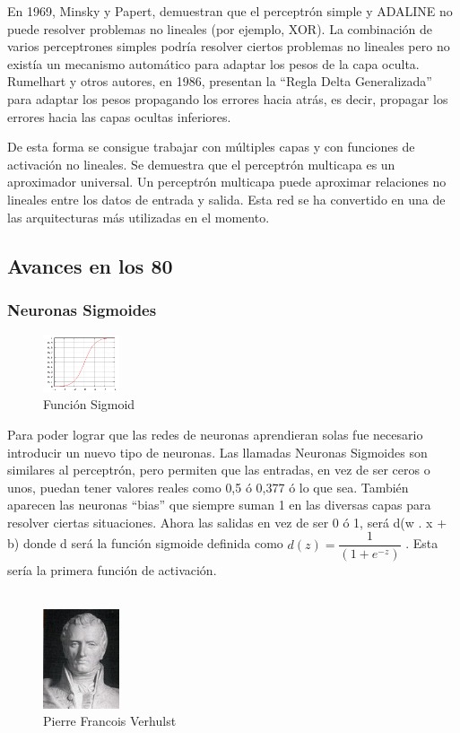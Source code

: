 \documentclass[a4paper]{article}
\begin{document}
En 1969, Minsky y Papert, demuestran que el perceptrón simple y 
ADALINE no puede resolver problemas no lineales (por ejemplo, 
XOR). La combinación de varios perceptrones simples podría 
resolver ciertos problemas no lineales pero no existía un 
mecanismo automático para adaptar los pesos de la capa oculta. 
Rumelhart y otros autores, en 1986, presentan la ``Regla Delta 
Generalizada'' para adaptar los pesos propagando los errores hacia 
atrás, es decir, propagar los errores hacia las capas ocultas 
inferiores.


De esta forma se consigue trabajar con múltiples capas y con 
funciones de activación no lineales. Se demuestra que el 
perceptrón multicapa es un aproximador universal. Un perceptrón 
multicapa puede aproximar relaciones no lineales entre los datos 
de entrada y salida. Esta red se ha convertido en una de las 
arquitecturas más utilizadas en el momento.

\subsection{Avances en los 80}

\subsubsection{Neuronas Sigmoides}
\begin{figure} %
    \centering
    \includegraphics[width=0.2\textwidth]{./images/Logistic-curve.png}
    \caption{Función Sigmoid}
\end{figure}

Para poder lograr que las redes de neuronas aprendieran solas fue 
necesario introducir un nuevo tipo de neuronas. Las llamadas 
Neuronas Sigmoides son similares al perceptrón, pero permiten que 
las entradas, en vez de ser ceros o unos, puedan tener valores 
reales como 0,5 ó 0,377 ó lo que sea. También aparecen las 
neuronas ``bias'' que siempre suman 1 en las diversas capas para 
resolver ciertas situaciones. Ahora las salidas en vez de ser 0 ó 
1, será d(w . x + b) donde d será la función sigmoide definida 
como $d(z) = \dfrac{1}{( 1 +e^{-z})}$ . Esta sería la primera 
función de activación.
\\
\\
\begin{figure} %
    \centering
    \includegraphics[width=0.2\textwidth]{./images/Pierre_Francois.jpeg}
    \caption{Pierre Francois Verhulst}
\end{figure}
\end{document}

